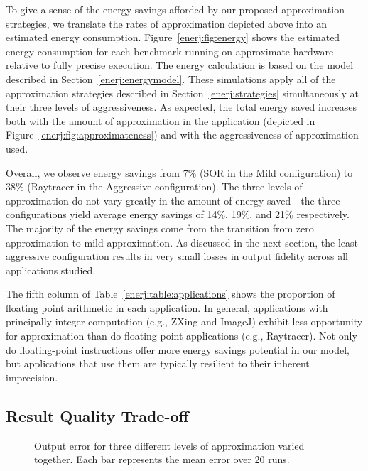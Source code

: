 To give a sense of the energy savings afforded by our proposed
approximation strategies, we translate the rates of approximation depicted
above into an estimated energy consumption. Figure~\ref{enerj:fig:energy}
shows the estimated energy consumption for each benchmark running on
approximate hardware relative to fully precise execution.
The energy calculation is based on the model
described in Section~\ref{enerj:energymodel}. These simulations apply
all of the approximation strategies described in
Section~\ref{enerj:strategies} simultaneously at their three levels of
aggressiveness. As expected, the total energy saved increases both with
the amount of approximation in the application (depicted in
Figure~\ref{enerj:fig:approximateness}) and with
the aggressiveness of approximation used.

Overall, we observe energy savings from 7\% (SOR in the Mild
configuration) to 38\% (Raytracer in the Aggressive
configuration). The three levels of approximation do not vary greatly
in the amount of energy saved---the three configurations yield average
energy savings of 14\%, 19\%, and 21\% respectively. The majority of
the energy savings come from the transition from zero approximation to
mild approximation. As discussed in the next section, the least
aggressive configuration results in very small losses in output
fidelity across all applications studied.

The fifth column of Table~\ref{enerj:table:applications} shows the proportion of
floating point arithmetic in each application. In general, applications with
principally integer computation (e.g., ZXing and ImageJ) exhibit less
opportunity for approximation than do floating-point applications (e.g.,
Raytracer). Not only do floating-point instructions offer more energy savings
potential in our model, but applications that use them are typically resilient
to their inherent imprecision.

\subsection{Result Quality Trade-off}
\begin{figure}
\center
\sffamily

\caption{Output error for three different levels of approximation varied
together. Each bar represents the mean error over 20 runs.}
\label{enerj:fig:sensitivity}
\end{figure}

